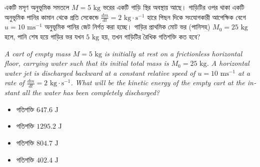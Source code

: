 \documentclass[12pt, a4paper]{article}
\begin{document}
\begin{tcolorbox}[questionbox={প্রশ্ন (Question) 41}]
    \noindent
    একটি মসৃণ অনুভূমিক সমতলে $M = 5\text{ kg}$ ভরের একটি গাড়ি স্থির অবস্থায় আছে। গাড়িটির ওপর থাকা একটি অনুভূমিক পানির কামান থেকে প্রতি সেকেন্ডে $\frac{dm}{dt} = 2\text{ kg}\cdot\text{s}^{-1}$ হারে পিছন দিকে সংযোগকারী আপেক্ষিক বেগে $u = 10\text{ ms}^{-1}$ অনুভূমিক পানির জেট নির্গত করা হচ্ছে। গাড়ির প্রাথমিক মোট ভর (পানিসহ) $M_0 = 25\text{ kg}$ হলে, পানি শেষ হয়ে গাড়ির ভর যখন $5\text{ kg}$ হয়, তখন গাড়িটির রৈখিক গতিশক্তি কত হবে?
    
    \vspace{0.8em}
    \begin{english}
    \noindent\textit{\color{darkgray}
    A cart of empty mass $M = 5\text{ kg}$ is initially at rest on a frictionless horizontal floor, carrying water such that its initial total mass is $M_0 = 25\text{ kg}$. A horizontal water jet is discharged backward at a constant relative speed of $u = 10\text{ ms}^{-1}$ at a rate of $\frac{dm}{dt} = 2\text{ kg}\cdot\text{s}^{-1}$. What will be the kinetic energy of the empty cart at the instant all the water has been completely discharged?
    }
    \end{english}
\end{tcolorbox}

\vspace{1em}
\begin{center}
\end{center}
\vspace{1em}

\begin{itemize}[label={}, leftmargin=1cm, itemsep=0.5em]
    \item[\textbf{A)}] গতিশক্তি $647.6\text{ J}$
    \item[\textbf{B)}] গতিশক্তি $1295.2\text{ J}$
    \item[\textbf{C)}] গতিশক্তি $804.7\text{ J}$
    \item[\textbf{D)}] গতিশক্তি $402.4\text{ J}$
\end{itemize}
\end{document}
